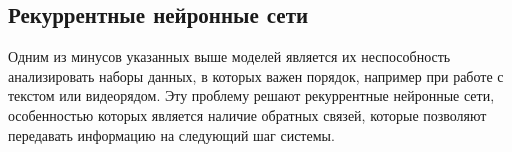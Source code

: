 \subsection{Рекуррентные нейронные сети}
Одним из минусов указанных выше моделей является их неспособность анализировать наборы данных, в которых важен порядок, например при работе с текстом или видеорядом. Эту проблему решают рекуррентные нейронные сети, особенностью которых является наличие обратных связей, которые позволяют передавать информацию на следующий шаг системы.


\clearpage